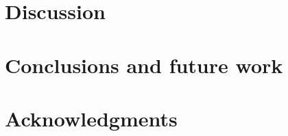 \documentclass{llncs}
\begin{document}
\section{Discussion}\label{discussion}

\section{Conclusions and future work}\label{conclusion}

\section{Acknowledgments}



\end{document}
